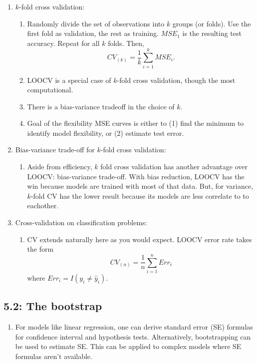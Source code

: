 \documentclass{article}
\begin{document}
\begin{enumerate}
\item $k$-fold cross validation:
\begin{enumerate}
\item Randomly divide the set of observations into $k$ groups (or folds). Use the first fold as validation, the rest as training. $MSE_1$ is the resulting test accuracy. Repeat for all $k$ folds. Then,
\[
CV_{(k)} = \frac{1}{k} \sum_{i=1}^k MSE_i.
\]
\item LOOCV is a special case of $k$-fold cross validation, though the most computational.
\item There is a bias-variance tradeoff in the choice of $k$.
\item Goal of the flexibility MSE curves is either to (1) find the minimum to identify model flexibility, or (2) estimate test error.
\end{enumerate}

\item Bias-variance trade-off for $k$-fold cross validation:
\begin{enumerate}
\item Aside from efficiency, $k$ fold cross validation has another advantage over LOOCV: bias-variance trade-off. With bias reduction, LOOCV has the win because models are trained with most of that data. But, for variance, $k$-fold CV has the lower result because its models are less correlate to to eachother.
\end{enumerate}

\item Cross-validation on classification problems:
\begin{enumerate}
\item CV extends naturally here as you would expect. LOOCV error rate takes the form
\[
CV_{(n)} = \frac{1}{n} \sum_{i=1}^n Err_i
\]
where $Err_i = I(y_i \neq \hat{y}_i)$.
\end{enumerate}

\end{enumerate}

\subsection*{5.2: The bootstrap}

\begin{enumerate}
\item For models like linear regression, one can derive standard error (SE) formulas for confidence interval and hypothesis tests. Alternatively, bootstrapping can be used to estimate SE. This can be applied to complex models where SE formulas aren't available.

\end{enumerate}
\end{document}
